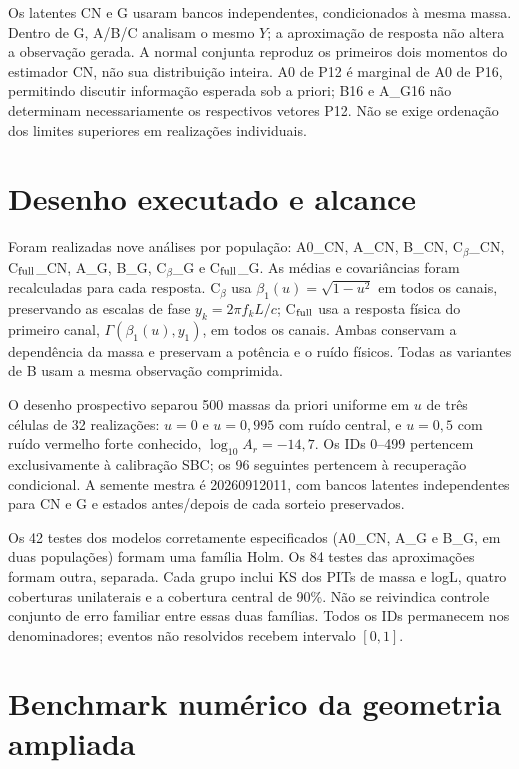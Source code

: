 Os latentes CN e G usaram bancos independentes, condicionados à mesma massa. Dentro de G, A/B/C analisam o mesmo $Y$; a aproximação de resposta não altera a observação gerada. A normal conjunta reproduz os primeiros dois momentos do estimador CN, não sua distribuição inteira. A0 de P12 é marginal de A0 de P16, permitindo discutir informação esperada sob a priori; B16 e A\_G16 não determinam necessariamente os respectivos vetores P12. Não se exige ordenação dos limites superiores em realizações individuais.

\section{Desenho executado e alcance}

Foram realizadas nove análises por população: A0\_CN, A\_CN, B\_CN, C$_\beta$\_CN, C$_{\rm full}$\_CN, A\_G, B\_G, C$_\beta$\_G e C$_{\rm full}$\_G. As médias e covariâncias foram recalculadas para cada resposta. C$_\beta$ usa $\beta_1(u)=\sqrt{1-u^2}$ em todos os canais, preservando as escalas de fase $y_k=2\pi f_kL/c$; C$_{\rm full}$ usa a resposta física do primeiro canal, $\Gamma(\beta_1(u),y_1)$, em todos os canais. Ambas conservam a dependência da massa e preservam a potência e o ruído físicos. Todas as variantes de B usam a mesma observação comprimida.

O desenho prospectivo separou 500 massas da priori uniforme em $u$ de três células de 32 realizações: $u=0$ e $u=0{,}995$ com ruído central, e $u=0{,}5$ com ruído vermelho forte conhecido, $\log_{10}A_r=-14{,}7$. Os IDs 0--499 pertencem exclusivamente à calibração SBC; os 96 seguintes pertencem à recuperação condicional. A semente mestra é 20260912011, com bancos latentes independentes para CN e G e estados antes/depois de cada sorteio preservados.

Os 42 testes dos modelos corretamente especificados (A0\_CN, A\_G e B\_G, em duas populações) formam uma família Holm. Os 84 testes das aproximações formam outra, separada. Cada grupo inclui KS dos PITs de massa e logL, quatro coberturas unilaterais e a cobertura central de 90\%. Não se reivindica controle conjunto de erro familiar entre essas duas famílias. Todos os IDs permanecem nos denominadores; eventos não resolvidos recebem intervalo $[0,1]$.

\section{Benchmark numérico da geometria ampliada}

